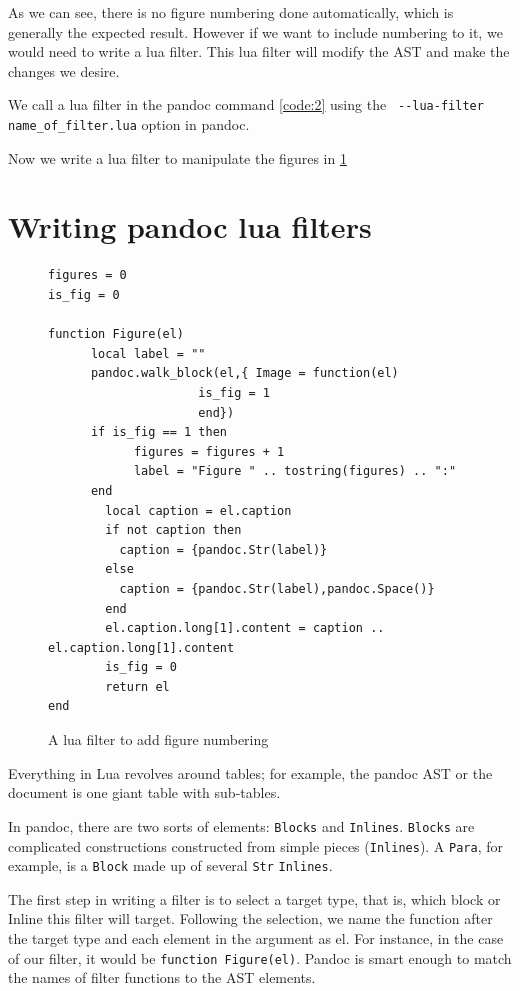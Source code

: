 As we can see, there is no figure numbering done automatically, which is generally
the expected result. However if we want to include numbering to it, we would need
to write a lua filter. This lua filter will modify the AST and make the changes we 
desire.

We call a lua filter in the pandoc command \ref{code:2} using the \verb| --lua-filter name_of_filter.lua|
option in pandoc.

Now we write a lua filter to manipulate the figures in \ref{code:3}

\section{Writing pandoc lua filters}

\begin{figure}[htbp]
\begin{verbatim}
figures = 0
is_fig = 0

function Figure(el)
      local label = ""
      pandoc.walk_block(el,{ Image = function(el)
                     is_fig = 1
                     end})
      if is_fig == 1 then
	        figures = figures + 1
	        label = "Figure " .. tostring(figures) .. ":"
      end
	    local caption = el.caption
	    if not caption then
          caption = {pandoc.Str(label)}
    	else
          caption = {pandoc.Str(label),pandoc.Space()}
    	end
    	el.caption.long[1].content = caption .. el.caption.long[1].content
    	is_fig = 0
    	return el
end
\end{verbatim}
\caption{A lua filter to add figure numbering}
\label{code:3}
\end{figure}

Everything in Lua revolves around tables; for example, the pandoc AST or the document is one giant table with sub-tables.

In pandoc, there are two sorts of elements: \verb|Blocks| and \verb|Inlines|. \verb|Blocks| are complicated constructions constructed from simple pieces (\verb|Inlines|). A \verb|Para|, for example, is a \verb|Block| made up of several \verb|Str| \verb|Inlines|.

The first step in writing a filter is to select a target type, that is, which block or Inline this filter will target.
Following the selection, we name the function after the target type and each element in the argument as el.
For instance, in the case of our filter, it would be \verb|function Figure(el)|. Pandoc is smart enough to match the names of filter functions to the AST elements.

